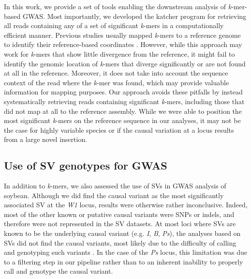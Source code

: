 In this work, we provide a set of tools enabling the downstream analysis of
\emph{k}-mer-based GWAS. Most importantly, we developed the katcher program for
retrieving all reads containing any of a set of significant \emph{k}-mers in a
computationally efficient manner. Previous studies usually mapped \emph{k}-mers
to a reference genome to identify their reference-based coordinates
\citep[e.g.][]{voichek2020, he2021, rahman2018, tripodi2021}.  However, while
this approach may work for \emph{k}-mers that show little divergence from the
reference, it might fail to identify the genomic location of \emph{k}-mers that
diverge significantly or are not found at all in the reference. Moreover, it
does not take into account the sequence context of the read where the
\emph{k}-mer was found, which may provide valuable information for mapping
purposes. Our approach avoids these pitfalls by instead systematically
retrieving reads containing significant \emph{k}-mers, including those that did
not map at all to the reference assembly. While we were able to position the
most significant \emph{k}-mers on the reference sequence in our analyses, it
may not be the case for highly variable species or if the causal variation at a
locus results from a large novel insertion.

\subsection*{Use of SV genotypes for GWAS}
\label{use-of-svs-for-gwas}

In addition to \emph{k}-mers, we also assessed the use of SVs in GWAS analysis
of soybean.  Although we did find the causal variant as the most significantly
associated SV at the \emph{W1} locus, results were otherwise rather
inconclusive.  Indeed, most of the other known or putative causal variants were
SNPs or indels, and therefore were not represented in the SV datasets. At most
loci where SVs are known to be the underlying causal variant (e.g.  \emph{I},
\emph{B}, \emph{Ps}), the analyses based on SVs did not find the causal
variants, most likely due to the difficulty of calling and genotyping such
variants \citep{kosugi2019, lemay2022}. In the case of the \textit{Ps} locus,
this limitation was due to a filtering step in our pipeline rather than to an
inherent inability to properly call and genotype the causal variant.

